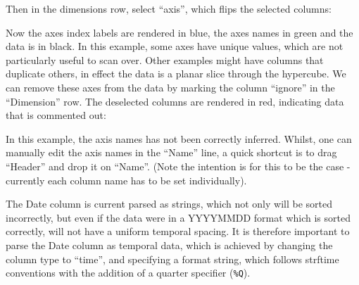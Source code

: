 \begin{center}
\end{center}

Then in the dimensions row, select ``axis'', which flips the selected
columns:

\begin{center}
\end{center}



Now the axes index labels are rendered in blue, the axes names in
green and the data is in black. In this example, some axes have unique
values, which are not particularly useful to scan over. Other examples
might have columns that duplicate others, in effect the data is a
planar slice through the hypercube. We can remove these axes from the
data by marking the column ``ignore'' in the ``Dimension'' row. The
deselected columns are rendered in red, indicating data that is
commented out:

\begin{center}
\end{center}

In this example, the axis names has not been correctly
inferred. Whilst, one can manually edit the axis names in the ``Name''
line, a quick shortcut is to drag ``Header'' and drop it on
``Name''. (Note the intention is for this to be the case - currently
each column name has to be set individually).

\begin{center}
\end{center}


The Date column is current parsed as strings, which not only will be
sorted incorrectly, but even if the data were in a YYYYMMDD format
which is sorted correctly, will not have a uniform temporal
spacing. It is therefore important to parse the Date column as
temporal data, which is achieved by changing the column type to
``time'', and specifying a format string, which follows strftime
conventions with the addition of a quarter specifier (\verb+%Q+).
\label{strftime format specifier}

